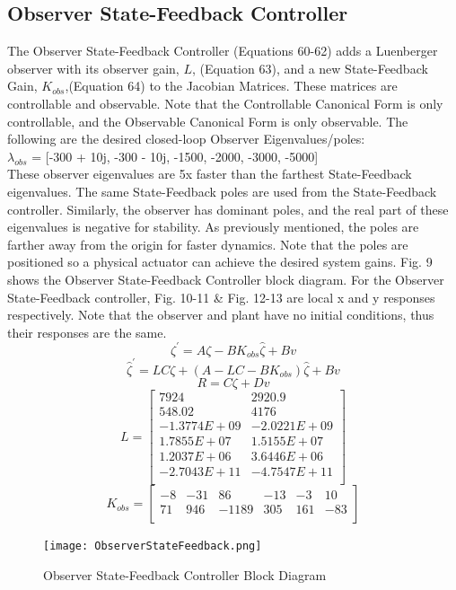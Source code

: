 \documentclass[conference]{IEEEtran}
\begin{document}
\subsection{Observer State-Feedback Controller}
The Observer State-Feedback Controller (Equations 60-62) adds a Luenberger observer with its observer gain, $L$, (Equation 63), and a new State-Feedback Gain, $K_{obs}$,(Equation 64) to the Jacobian Matrices. These matrices are controllable and observable. Note that the Controllable Canonical Form is only controllable, and the Observable Canonical Form is only observable. The following are the desired closed-loop Observer Eigenvalues/poles:\\
$\lambda_{obs}$ = [-300 + 10j, -300 - 10j, -1500, -2000, -3000, -5000]\\
These observer eigenvalues are 5x faster than the farthest State-Feedback eigenvalues. The same State-Feedback poles are used from the State-Feedback controller. Similarly, the observer has dominant poles, and the real part of these eigenvalues is negative for stability. As previously mentioned, the poles are farther away from the origin for faster dynamics. Note that the poles are positioned so a physical actuator can achieve the desired system gains. Fig. 9 shows the Observer State-Feedback Controller block diagram. For the Observer State-Feedback controller, Fig. 10-11 \& Fig. 12-13 are local x and y responses respectively. Note that the observer and plant have no initial conditions, thus their responses are the same.  
\[
\zeta^\prime = A\zeta -BK_{obs}\hat{\zeta} + Bv\tag{60}
\]
\[
\hat{\zeta}^\prime = LC\zeta + (A - LC -BK_{obs})\hat{\zeta} + Bv
\tag{61}
\] 
\[
R = C\zeta + Dv
\tag{62}
\] 
\[
L =  
\begin{bmatrix}
7924   &    2920.9\\
548.02    &     4176\\
-1.3774E+09  &-2.0221E+09\\
1.7855E+07  & 1.5155E+07\\
1.2037E+06  & 3.6446E+06\\
-2.7043E+11  &-4.7547E+11\\
\end{bmatrix}
\tag{63}
\] 
\[
K_{obs} =  
\begin{bmatrix}
-8   & -31  & 86  & -13 & -3  &  10\\
 71  &  946 &-1189  & 305 &  161  & -83\\
\end{bmatrix}
\tag{64}
\] 

\begin{figure}[htbp]
\centering
\centerline{\texttt{[image: ObserverStateFeedback.png]}}
\caption{Observer State-Feedback Controller Block Diagram}
\label{figure}
\end{figure}
\end{document}
